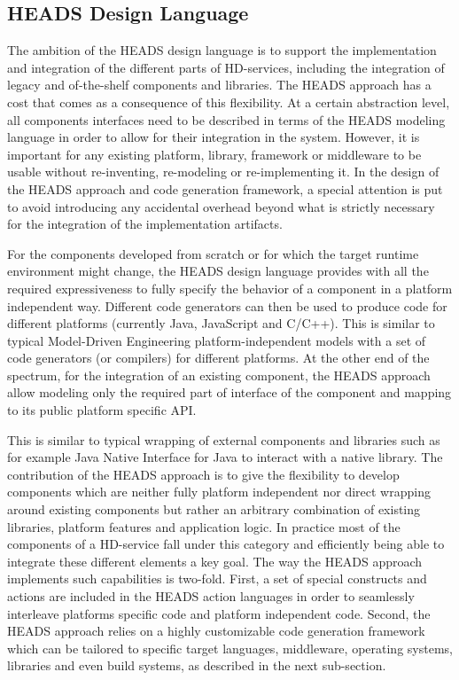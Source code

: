 \subsection{HEADS Design Language}

The ambition of the HEADS design language is to support the implementation and integration of the different parts of HD-services, including the integration of legacy and of-the-shelf components and libraries. The HEADS approach has a cost that comes as a consequence of this flexibility. At a certain abstraction level, all components interfaces need to be described in terms of the HEADS modeling language in order to allow for their integration in the system. However, it is important for any existing platform, library, framework or middleware to be usable without re-inventing, re-modeling or re-implementing it. In the design of the HEADS approach and code generation framework, a special attention is put to avoid introducing any accidental overhead beyond what is strictly necessary for the integration of the implementation artifacts. 

For the components developed from scratch or for which the target runtime environment might change, the HEADS design language provides with all the required expressiveness to fully specify the behavior of a component in a platform independent way. Different code generators can then be used to produce code for different platforms (currently Java, JavaScript and C/C++). This is similar to typical Model-Driven Engineering platform-independent models with a set of code generators (or compilers) for different platforms. At the other end of the spectrum, for the integration of an existing component, the HEADS approach allow modeling only the required part of interface of the component and mapping to its public platform specific API. 

This is similar to typical wrapping of external components and libraries such as for example Java Native Interface for Java to interact with a native library. The contribution of the HEADS approach is to give the flexibility to develop components which are neither fully platform independent nor direct wrapping around existing components but rather an arbitrary combination of existing libraries, platform features and application logic. In practice most of the components of a HD-service fall under this category and efficiently being able to integrate these different elements a key goal. The way the HEADS approach implements such capabilities is two-fold. First, a set of special constructs and actions are included in the HEADS action languages in order to seamlessly interleave platforms specific code and platform independent code. Second, the HEADS approach relies on a highly customizable code generation framework which can be tailored to specific target languages, middleware, operating systems, libraries and even build systems, as described in the next sub-section.

